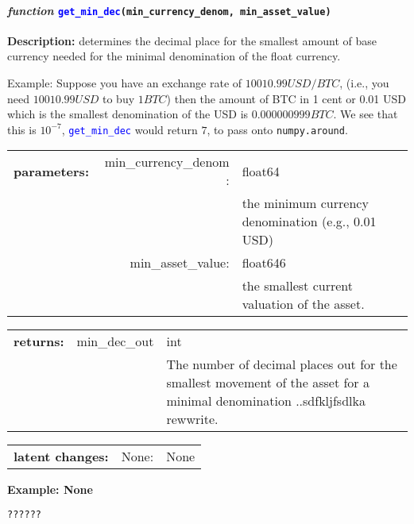 \paragraph{\textit{function} \textcolor{blue}{\texttt{get\_min\_dec}}\texttt{(min\_currency\_denom, min\_asset\_value)}}\hfill\break
\noindent \textbf{Description:} determines the decimal place for the smallest amount of base currency needed for the minimal denomination of the float currency. 

\noindent Example:  Suppose you have an exchange rate of $10010.99 USD/BTC$, (i.e., you need $10010.99 USD$ to buy $1 BTC$) then the amount of BTC in 1 cent or 0.01 USD which is the smallest denomination of the USD is $0.000000999 BTC$. We see that this is $10^{-7}$,  \textcolor{blue}{\texttt{get\_min\_dec}} would return $7$, to pass onto \texttt{numpy.around}.


\begin{tabular}{r r l }
	\textbf{parameters:}	& min\_currency\_denom : & float64\\
	&  & the minimum currency denomination (e.g., 0.01 USD)\\
	& min\_asset\_value:& float646\\
	&& the smallest current valuation of the asset.\\
\end{tabular}

\begin{tabular}{l c l}
	\textbf{returns:} & min\_dec\_out & int\\
	& & The number of decimal places out for the smallest movement of the asset for a minimal denomination ..sdfkljfsdlka rewwrite.  
\end{tabular}

\begin{tabular}{l c l}
	\textbf{latent changes:} & None: & None\\
\end{tabular}

\textbf{Example: None}
\begin{lstlisting}[language=Python]
??????


\end{lstlisting}